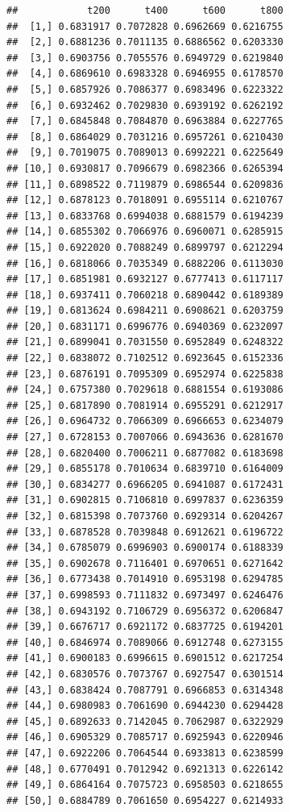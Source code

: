 \documentclass[
  11pt,
]{article}
\begin{document}
\begin{verbatim}
##            t200      t400      t600      t800
##  [1,] 0.6831917 0.7072828 0.6962669 0.6216755
##  [2,] 0.6881236 0.7011135 0.6886562 0.6203330
##  [3,] 0.6903756 0.7055576 0.6949729 0.6219840
##  [4,] 0.6869610 0.6983328 0.6946955 0.6178570
##  [5,] 0.6857926 0.7086377 0.6983496 0.6223322
##  [6,] 0.6932462 0.7029830 0.6939192 0.6262192
##  [7,] 0.6845848 0.7084870 0.6963884 0.6227765
##  [8,] 0.6864029 0.7031216 0.6957261 0.6210430
##  [9,] 0.7019075 0.7089013 0.6992221 0.6225649
## [10,] 0.6930817 0.7096679 0.6982366 0.6265394
## [11,] 0.6898522 0.7119879 0.6986544 0.6209836
## [12,] 0.6878123 0.7018091 0.6955114 0.6210767
## [13,] 0.6833768 0.6994038 0.6881579 0.6194239
## [14,] 0.6855302 0.7066976 0.6960071 0.6285915
## [15,] 0.6922020 0.7088249 0.6899797 0.6212294
## [16,] 0.6818066 0.7035349 0.6882206 0.6113030
## [17,] 0.6851981 0.6932127 0.6777413 0.6117117
## [18,] 0.6937411 0.7060218 0.6890442 0.6189389
## [19,] 0.6813624 0.6984211 0.6908621 0.6203759
## [20,] 0.6831171 0.6996776 0.6940369 0.6232097
## [21,] 0.6899041 0.7031550 0.6952849 0.6248322
## [22,] 0.6838072 0.7102512 0.6923645 0.6152336
## [23,] 0.6876191 0.7095309 0.6952974 0.6225838
## [24,] 0.6757380 0.7029618 0.6881554 0.6193086
## [25,] 0.6817890 0.7081914 0.6955291 0.6212917
## [26,] 0.6964732 0.7066309 0.6966653 0.6234079
## [27,] 0.6728153 0.7007066 0.6943636 0.6281670
## [28,] 0.6820400 0.7006211 0.6877082 0.6183698
## [29,] 0.6855178 0.7010634 0.6839710 0.6164009
## [30,] 0.6834277 0.6966205 0.6941087 0.6172431
## [31,] 0.6902815 0.7106810 0.6997837 0.6236359
## [32,] 0.6815398 0.7073760 0.6929314 0.6204267
## [33,] 0.6878528 0.7039848 0.6912621 0.6196722
## [34,] 0.6785079 0.6996903 0.6900174 0.6188339
## [35,] 0.6902678 0.7116401 0.6970651 0.6271642
## [36,] 0.6773438 0.7014910 0.6953198 0.6294785
## [37,] 0.6998593 0.7111832 0.6973497 0.6246476
## [38,] 0.6943192 0.7106729 0.6956372 0.6206847
## [39,] 0.6676717 0.6921172 0.6837725 0.6194201
## [40,] 0.6846974 0.7089066 0.6912748 0.6273155
## [41,] 0.6900183 0.6996615 0.6901512 0.6217254
## [42,] 0.6830576 0.7073767 0.6927547 0.6301514
## [43,] 0.6838424 0.7087791 0.6966853 0.6314348
## [44,] 0.6980983 0.7061690 0.6944230 0.6294428
## [45,] 0.6892633 0.7142045 0.7062987 0.6322929
## [46,] 0.6905329 0.7085717 0.6925943 0.6220946
## [47,] 0.6922206 0.7064544 0.6933813 0.6238599
## [48,] 0.6770491 0.7012942 0.6921313 0.6226142
## [49,] 0.6864164 0.7075723 0.6958503 0.6218655
## [50,] 0.6884789 0.7061650 0.6954227 0.6214933
\end{verbatim}
\end{document}
